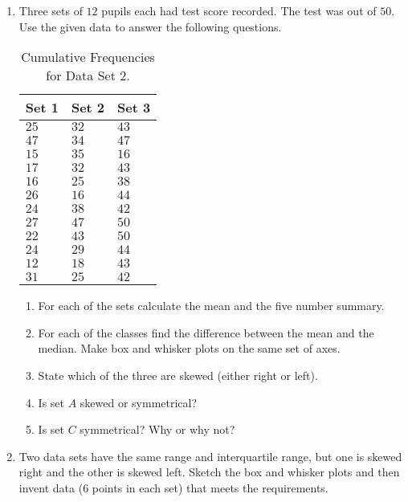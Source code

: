 {
\begin{enumerate}
\item Three sets of $12$ pupils each had test score recorded. The test was out of $50$. Use the given data to answer the following questions.
\begin{table}[htb]
\begin{center}
\begin{tabular}{|l|l|l|}
\hline
Set 1 & Set 2 & Set 3 \\ 
\hline
$25$ & $32$ & $43$ \\
$47$ & $34$ & $47$ \\
$15$ & $35$ & $16$ \\
$17$ & $32$ & $43$ \\
$16$ & $25$ & $38$ \\
$26$ & $16$ & $44$ \\
$24$ & $38$ & $42$ \\
$27$ & $47$ & $50$ \\
$22$ & $43$ & $50$ \\
$24$ & $29$ & $44$ \\
$12$ & $18$ & $43$ \\
$31$ & $25$ & $42 $\\
\hline
\end{tabular}
\caption{Cumulative Frequencies for Data Set 2. \label{tab:mdat:s:cumulativeds2}}
\end{center}
\end{table}
\begin{enumerate}
\item For each of the sets calculate the mean and the five number summary.
\item For each of the classes find the difference between the mean and the median. Make box and whisker plots on the same set of axes.
\item State which of the three are skewed (either right or left).
\item Is set $A$ skewed or symmetrical? 
\item Is set $C$ symmetrical? Why or why not?
\end{enumerate}
\item Two data sets have the same range and interquartile range, but one is skewed right and the other is skewed left. Sketch the box and whisker plots and then invent data ($6$ points in each set) that meets the requirements.
\end{enumerate}
}

